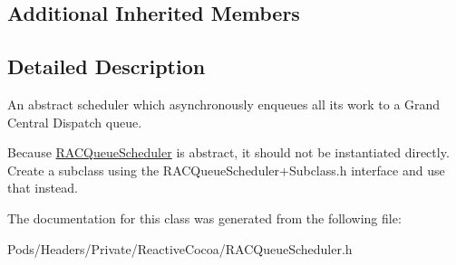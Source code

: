 \subsection*{Additional Inherited Members}


\subsection{Detailed Description}
An abstract scheduler which asynchronously enqueues all its work to a Grand Central Dispatch queue.

Because \mbox{\hyperlink{interface_r_a_c_queue_scheduler}{R\+A\+C\+Queue\+Scheduler}} is abstract, it should not be instantiated directly. Create a subclass using the {\ttfamily R\+A\+C\+Queue\+Scheduler+\+Subclass.h} interface and use that instead. 

The documentation for this class was generated from the following file\+:\begin{DoxyCompactItemize}
\item 
Pods/\+Headers/\+Private/\+Reactive\+Cocoa/R\+A\+C\+Queue\+Scheduler.\+h\end{DoxyCompactItemize}
